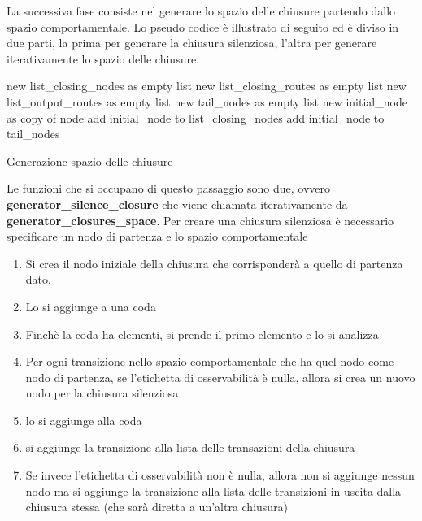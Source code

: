 La successiva fase consiste nel generare lo spazio delle chiusure partendo dallo spazio comportamentale.
Lo pseudo codice è illustrato di seguito ed è diviso in due parti, la prima per generare la chiusura silenziosa, l'altra per generare iterativamente lo spazio delle chiusure.

\begin{algorithm}[H]
\SetAlgoLined
{}
 new list\_closing\_nodes as empty list\;
 new list\_closing\_routes as empty list\;
 new list\_output\_routes as empty list\;
 new tail\_nodes as empty list\;
 \;
 \;
 new initial\_node as copy of node\;
 add initial\_node to list\_closing\_nodes\; 
 add initial\_node to tail\_nodes\;
 
 
 \caption{Generazione spazio delle chiusure}
\end{algorithm}

Le funzioni che si occupano di questo passaggio sono due, ovvero \textbf{generator\_silence\_closure} che viene chiamata iterativamente da \textbf{generator\_closures\_space}.
Per creare una chiusura silenziosa è necessario specificare un nodo di partenza e lo spazio comportamentale
\begin{enumerate}
    \item Si crea il nodo iniziale della chiusura che corrisponderà a quello di partenza dato.
    \item Lo si aggiunge a una coda
    \item Finchè la coda ha elementi, si prende il primo elemento e lo si analizza
    \item Per ogni transizione nello spazio comportamentale che ha quel nodo come nodo di partenza, se l’etichetta di osservabilità è nulla, allora si crea un nuovo nodo per la chiusura silenziosa
    \item lo si aggiunge alla coda
    \item si aggiunge la transizione alla lista delle transazioni della chiusura
    \item Se invece l’etichetta di osservabilità non è nulla, allora non si aggiunge nessun nodo ma si aggiunge la transizione alla lista delle transizioni in uscita dalla chiusura stessa (che sarà diretta a un’altra chiusura)

\end{enumerate}

